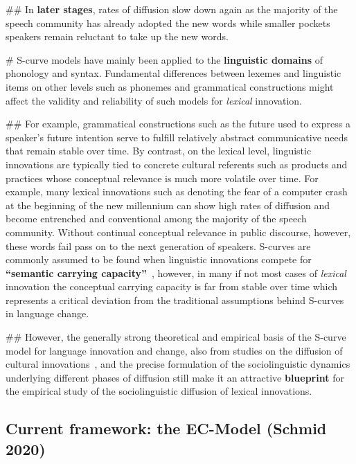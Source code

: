 \documentclass[a4paper, abstract=on]{scrartcl}
\renewcommand{\hw}[1]{\textbf{#1}}
\begin{document}
\begin{easylist}[itemize]
        ## In \hw{later stages}, rates of diffusion slow down again as the majority of the speech community has already adopted the new words while smaller pockets speakers remain reluctant to take up the new words.

      # S-curve models have mainly been applied to the \hw{linguistic domains} of phonology and syntax. Fundamental differences between lexemes and linguistic items on other levels such as phonemes and grammatical constructions might affect the validity and reliability of such models for \emph{lexical} innovation.

        ## For example, grammatical constructions such as the  future used to express a speaker's future intention serve to fulfill relatively abstract communicative needs that remain stable over time. By contrast, on the lexical level, linguistic innovations are typically tied to concrete cultural referents such as products and practices whose conceptual relevance is much more volatile over time. For example, many lexical innovations such as  denoting the fear of a computer crash at the beginning of the new millennium can show high rates of diffusion and become entrenched and conventional among the majority of the speech community. Without continual conceptual relevance in public discourse, however, these words fail pass on to the next generation of speakers. S-curves are commonly assumed to be found when linguistic innovations compete for \hw{\enquote{semantic carrying capacity}}~\parencite{Nini2017}, however, in many if not most cases of \emph{lexical} innovation the conceptual carrying capacity is far from stable over time which represents a critical deviation from the traditional assumptions behind S-curves in language change.

        ## However, the generally strong theoretical and empirical basis of the S-curve model for language innovation and change, also from studies on the diffusion of cultural innovations~\parencite{Rogers1962}, and the precise formulation of the sociolinguistic dynamics underlying different phases of diffusion still make it an attractive \hw{blueprint} for the empirical study of the sociolinguistic diffusion of lexical innovations.

    \end{easylist}

  \subsection{Current framework: the EC-Model (Schmid 2020)}
    \nocite{Schmid2020}
\end{document}

